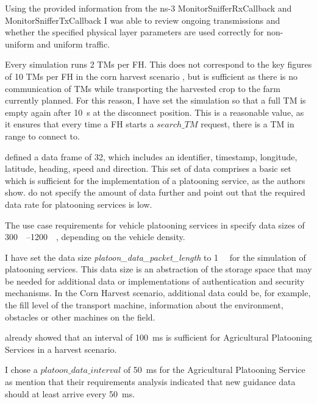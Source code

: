 Using the provided information from the ns-3 MonitorSnifferRxCallback and MonitorSnifferTxCallback I was able to review ongoing transmissions and
whether the specified physical layer parameters are used correctly for non-uniform and uniform traffic.

Every simulation runs \num{2} \ac{TM}s per \ac{FH}.
This does not correspond to the key figures of 10 \ac{TM}s per \ac{FH} in the corn harvest scenario \cite{faustzahlen2018},
but is sufficient as there is no communication of \ac{TM}s while transporting the harvested crop to the farm currently planned.
For this reason, I have set the simulation so that a full \ac{TM} is empty again after \SI{10}{\second} at the disconnect position.
This is a reasonable value, as it ensures that every time a \ac{FH} starts a $search\_TM$ request, there is a \ac{TM} in range to connect to.

\textcite{zhang_method_2009} defined a data frame of \SI{32}{\byte}, which includes an identifier, timestamp, longitude,
latitude, heading, speed and direction.
This set of data comprises a basic set which is sufficient for the implementation of a platooning service,
as the authors show.
\textcite{schlingmann_aef_2019} do not specify the amount of data further and point out that the required data rate
for platooning services is low.

The use case requirements for vehicle platooning services in \cite{TR-22.886} specify data sizes of \SIrange{300}{1200}{\kilo\byte},
depending on the vehicle density.

I have set the data size \textit{platoon\_data\_packet\_length} to \SI{1}{\kilo\byte} for the simulation of platooning services.
This data size is an abstraction of the storage space that may be needed for additional data or implementations
of authentication and security mechanisms.
In the Corn Harvest scenario, additional data could be, for example, the fill level of the transport machine,
information about the environment, obstacles or other machines on the field.

\textcite{zhang_method_2009} already showed that an interval of \SI{100}{\milli\second} is sufficient for Agricultural Platooning Services
in a harvest scenario.

I chose a $platoon\_data\_interval$ of \SI{50}{\milli\second} for the Agricultural Platooning Service
as \textcite{smolnik_5g_2020} mention that their requirements analysis indicated that new guidance data should at least arrive every \SI{50}{\milli\second}.

